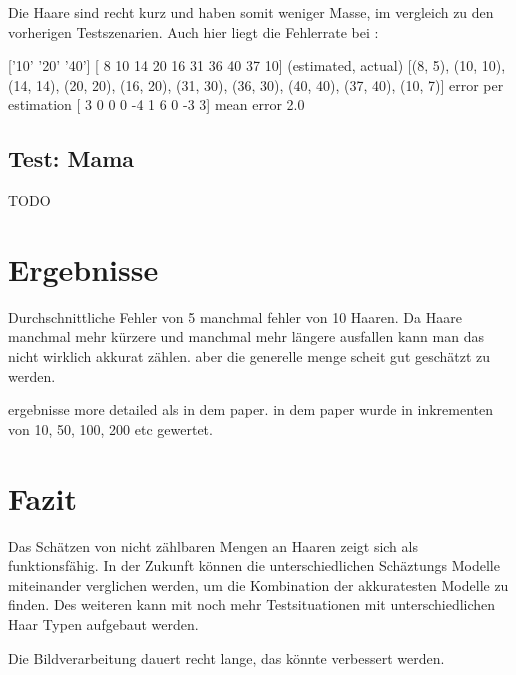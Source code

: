 \documentclass[german,a4paper, 12pt]{llncs}
\begin{document}
Die Haare sind recht kurz und haben somit weniger Masse, im vergleich zu den vorherigen Testszenarien. Auch hier liegt die Fehlerrate bei :  

['10' '20' '40']
[ 8 10 14 20 16 31 36 40 37 10]
(estimated, actual)
[(8, 5), (10, 10), (14, 14), (20, 20), (16, 20), (31, 30), (36, 30), (40, 40), (37, 40), (10, 7)]
error per estimation [ 3  0  0  0 -4  1  6  0 -3  3]
mean error 2.0

\subsection{Test: Mama}
TODO

\section{Ergebnisse}
Durchschnittliche Fehler von 5 manchmal fehler von 10 Haaren. 
Da Haare manchmal mehr kürzere und manchmal mehr längere ausfallen kann man das nicht wirklich akkurat zählen. aber die generelle menge scheit gut geschätzt zu werden. 

ergebnisse more detailed als in dem paper. in dem paper wurde in inkrementen von 10, 50, 100, 200 etc gewertet. 

\section{Fazit}
Das Schätzen von nicht zählbaren Mengen an Haaren zeigt sich als funktionsfähig. In der Zukunft können die unterschiedlichen Schäztungs Modelle miteinander verglichen werden, um die Kombination der akkuratesten Modelle zu finden. 
Des weiteren kann mit noch mehr Testsituationen mit unterschiedlichen Haar Typen aufgebaut werden. 

Die Bildverarbeitung dauert recht lange, das könnte verbessert werden. 

\end{document}
